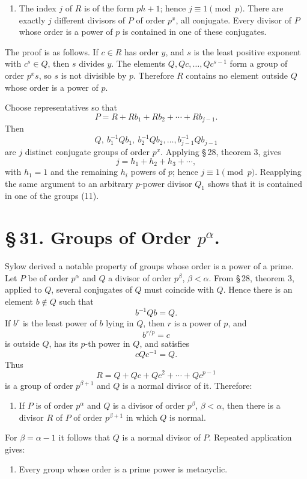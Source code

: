\documentclass[11pt]{article}
\begin{document}
\begin{enumerate}[label=\Roman*.,leftmargin=2.4em,start=2]
\item The index $j$ of $R$ is of the form $ph+1$; hence $j\equiv1\pmod p$. There are exactly $j$ different divisors of $P$ of order $p^x$, all conjugate. Every divisor of $P$ whose order is a power of $p$ is contained in one of these conjugates.
\end{enumerate}

The proof is as follows. If $c\in R$ has order $y$, and $s$ is the least positive exponent with $c^s\in Q$, then $s$ divides $y$. The elements $Q,Qc,
\ldots,Qc^{s-1}$ form a group of order $p^xs$, so $s$ is not divisible by $p$. Therefore $R$ contains no element outside $Q$ whose order is a power of $p$.

Choose representatives so that
\begin{equation}
P=R+Rb_1+Rb_2+\cdots+Rb_{j-1}.
\tag{10}
\end{equation}
Then
\begin{equation}
Q,
\ b_1^{-1}Qb_1,
\ b_2^{-1}Qb_2,
\ldots,b_{j-1}^{-1}Qb_{j-1}
\tag{11}
\end{equation}
are $j$ distinct conjugate groups of order $p^x$. Applying \S\,28, theorem 3, gives
\[
j=h_1+h_2+h_3+
\cdots,
\]
with $h_1=1$ and the remaining $h_i$ powers of $p$; hence $j\equiv1\pmod p$. Reapplying the same argument to an arbitrary $p$-power divisor $Q_1$ shows that it is contained in one of the groups (11).

\section*{\S\,31. Groups of Order $p^\alpha$.}

Sylow derived a notable property of groups whose order is a power of a prime. Let $P$ be of order $p^\alpha$ and $Q$ a divisor of order $p^\beta$, $\beta<\alpha$. From \S\,28, theorem 3, applied to $Q$, several conjugates of $Q$ must coincide with $Q$. Hence there is an element $b\notin Q$ such that
\[
b^{-1}Qb=Q.
\]
If $b^r$ is the least power of $b$ lying in $Q$, then $r$ is a power of $p$, and
\[
b^{r/p}=c
\]
is outside $Q$, has its $p$-th power in $Q$, and satisfies
\[
cQc^{-1}=Q.
\]
Thus
\[
R=Q+Qc+Qc^2+
\cdots+Qc^{p-1}
\]
is a group of order $p^{\beta+1}$ and $Q$ is a normal divisor of it. Therefore:
\begin{enumerate}[label=\Roman*.,leftmargin=2.4em,start=3]
\item If $P$ is of order $p^\alpha$ and $Q$ is a divisor of order $p^\beta$, $\beta<\alpha$, then there is a divisor $R$ of $P$ of order $p^{\beta+1}$ in which $Q$ is normal.
\end{enumerate}
For $\beta=\alpha-1$ it follows that $Q$ is a normal divisor of $P$. Repeated application gives:
\begin{enumerate}[label=\Roman*.,leftmargin=2.4em,start=4]
\item Every group whose order is a prime power is metacyclic.
\end{enumerate}
\end{document}
